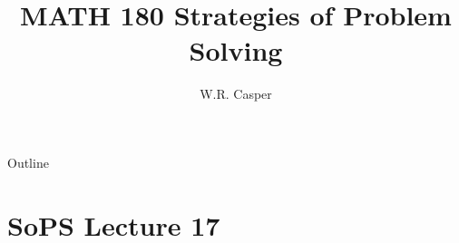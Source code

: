 \documentclass{beamer}
\title{MATH 180 Strategies of Problem Solving}
\subtitle
{} %
\author[W.R. Casper] %
{W.R. Casper}
\institute[California State University Fullerton] %
{
  Department of Mathematics\\
  California State University Fullerton}
\begin{document}
\begin{frame}
  \titlepage
\end{frame}

\begin{frame}{Outline}
  \tableofcontents
\end{frame}



\section{SoPS Lecture 17}
\end{document}
